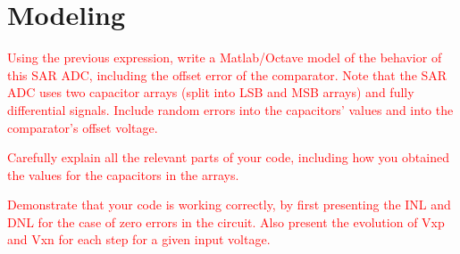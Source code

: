\section{Modeling}

\textcolor{red}{Using the previous expression, write a Matlab/Octave model of the behavior of
this SAR ADC, including the offset error of the comparator. Note that the SAR
ADC uses two capacitor arrays (split into LSB and MSB arrays) and fully
differential signals. Include random errors into the capacitors' values and into
the comparator's offset voltage.}

\textcolor{red}{Carefully explain all the relevant parts of your code, including how you obtained the values for the capacitors in the arrays.}

\textcolor{red}{Demonstrate that your code is working correctly, by first presenting the INL and DNL for the case of zero errors in the circuit. Also present the evolution of Vxp and Vxn for each step for a given input voltage.}



